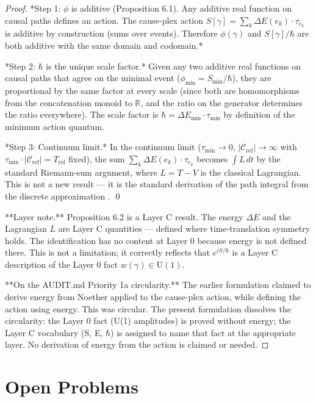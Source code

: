 \documentclass[11pt]{article}
\theoremstyle{definition}
\theoremstyle{remark}
\begin{document}
\begin{proof}

*Step 1: $\phi$ is additive (Proposition 6.1). Any additive real function on causal paths defines an action. The cause-plex action $S[\gamma] = \sum_k \Delta E(e_k) \cdot \tau_{e_k}$ is additive by construction (sums over events). Therefore $\phi(\gamma)$ and $S[\gamma]/\hbar$ are both additive with the same domain and codomain.*

*Step 2: $\hbar$ is the unique scale factor.* Given any two additive real functions on causal paths that agree on the minimal event ($\phi_{\min} = S_{\min}/\hbar$), they are proportional by the same factor at every scale (since both are homomorphisms from the concatenation monoid to $\mathbb{R}$, and the ratio on the generator determines the ratio everywhere). The scale factor is $\hbar = \Delta E_{\min} \cdot \tau_{\min}$ by definition of the minimum action quantum.

*Step 3: Continuum limit.* In the continuum limit ($\tau_{\min} \to 0$, $|\mathcal{C}_{\text{ref}}| \to \infty$ with $\tau_{\min} \cdot |\mathcal{C}_{\text{ref}}| = T_{\text{ref}}$ fixed), the sum $\sum_k \Delta E(e_k) \cdot \tau_{e_k}$ becomes $\int L\, dt$ by the standard Riemann-sum argument, where $L = T - V$ is the classical Lagrangian. This is not a new result — it is the standard derivation of the path integral from the discrete approximation \cite{Feynman1965}. \qed

**Layer note.** Proposition 6.2 is a Layer C result. The energy $\Delta E$ and the Lagrangian $L$ are Layer C quantities — defined where time-translation symmetry holds. The identification has no content at Layer 0 because energy is not defined there. This is not a limitation; it correctly reflects that $e^{iS/\hbar}$ is a Layer C description of the Layer 0 fact $w(\gamma) \in \mathrm{U}(1)$.

**On the AUDIT.md Priority 1a circularity.** The earlier formulation claimed to derive energy from Noether applied to the cause-plex action, while defining the action using energy. This was circular. The present formulation dissolves the circularity: the Layer 0 fact (U(1) amplitudes) is proved without energy; the Layer C vocabulary (S, E, $\hbar$) is assigned to name that fact at the appropriate layer. No derivation of energy from the action is claimed or needed.
\end{proof}

\medskip

\section{Open Problems}\label{open-problems}
\end{document}
